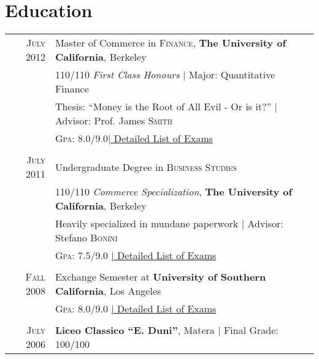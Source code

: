 \documentclass[a4paper,10pt]{article} %
\begin{document}

\section{Education}

\begin{tabular}{rl} 
  \textsc{July} 2012 & Master of Commerce in \textsc{Finance}, \textbf{The University of California}, Berkeley              \\
                     & 110/110 \small\emph{First Class Honours} | Major: Quantitative Finance                               \\
                     & Thesis: ``Money is the Root of All Evil - Or is it?'' | \small Advisor: Prof. James \textsc{Smith}   \\
                     & \normalsize \textsc{Gpa}: 8.0/9.0\hyperlink{grds}{\hfill | \footnotesize Detailed List of Exams}     \\
                     &                                                                                                      \\
  
  
  \textsc{July} 2011 & Undergraduate Degree in \textsc{}\textsc{Business Studies}                                           \\&110/110 \small\emph{Commerce Specialization}, \normalsize\textbf{The University of California}, Berkeley\\
                     & Heavily specialized in mundane paperwork | \small Advisor: Stefano \textsc{Bonini}                   \\
                     & \normalsize \textsc{Gpa}: 7.5/9.0 \hyperlink{grds_usc}{\hfill| \footnotesize Detailed List of Exams} \\
                     &                                                                                                      \\
  
  
  \textsc{Fall} 2008 & Exchange Semester at \textbf{University of Southern California}, Los Angeles                         \\
                     & \textsc{Gpa}: 8.0/9.0 \hyperlink{grds_usc}{\hfill| \footnotesize Detailed List of Exams}             \\
                     &                                                                                                      \\
  
  
  \textsc{July} 2006 & \textbf{Liceo Classico ``E. Duni''}, Matera | Final Grade: 100/100                                   
\end{tabular}
\end{document}
